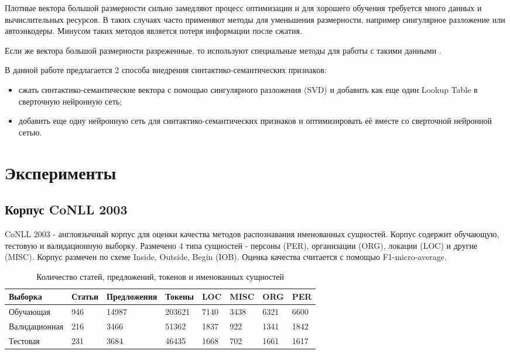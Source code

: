 \documentclass[a4paper,12pt]{article}
\begin{document}
    Плотные вектора большой размерности сильно замедляют процесс оптимизации и для хорошего
    обучения требуется много данных и вычислительных ресурсов.
    В таких случаях часто применяют методы для уменьшения размерности,
    например сингулярное разложение или автоэнкодеры. Минусом таких методов является потеря информации
    после сжатия.

    Если же вектора большой размерности разреженные, то используют специальные методы для
    работы с такими данными \citep{davissurvey}.

    В данной работе предлагается 2 способа внедрения синтактико-семантических признаков:
    \begin{itemize}
      \item сжать синтактико-семантические вектора с помощью сингулярного разложения (SVD) и добавить
      как еще один Lookup Table в сверточную нейронную сеть;
      \item добавить еще одну нейронную сеть для синтактико-семантических признаков и оптимизировать
      её вместе со сверточной нейронной сетью.
    \end{itemize}

\section{Эксперименты}

\subsection{Корпус CoNLL 2003}

CoNLL 2003 \citep{tjong2003introduction} - англоязычный корпус для оценки качества
методов распознавания именованных сущностей.
Корпус содержит обучающую, тестовую и валидационную выборку.
Размечено 4 типа сущностей - персоны (PER), организации (ORG), локации (LOC) и другие (MISC).
Корпус размечен по схеме Inside, Outside, Begin (IOB).
Оценка качества считается с помощью F1-micro-average.

\begin{table}[ht]
  \caption{Количество статей, предложений, токенов и именованных сущностей}
  \centering
  \begin{tabular}{ | p{3cm} | p{1.5cm} | p{2.5cm} | p{1.5cm} | p{1cm} | p{1cm} | p{1cm}| p{1cm} |}
    \hline\hline
    Выборка & Статьи & Предложения & Токены & LOC & MISC & ORG & PER \\
    \hline
    Обучающая & 946 & 14987 & 203621 & 7140 & 3438 & 6321 & 6600 \\
    \hline
    Валидационная & 216 & 3466 & 51362 & 1837 & 922 & 1341 & 1842 \\
    \hline
    Тестовая & 231 & 3684 & 46435 & 1668 & 702 & 1661 & 1617 \\
    \hline
  \end{tabular}
\end{table}
\end{document}
